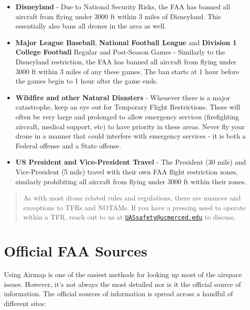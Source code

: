 \documentclass[
]{book}
\providecommand{\tightlist}{%
  \setlength{\itemsep}{0pt}\setlength{\parskip}{0pt}}
\begin{document}
\begin{itemize}
\tightlist
\item
  \textbf{Disneyland} - Due to National Security Risks, the FAA has banned all aircraft from flying under 3000 ft within 3 miles of Disneyland. This essentially also bans all drones in the area as well.\\
\item
  \textbf{Major League Baseball}, \textbf{National Football League} and \textbf{Division 1 College Football} Regular and Post-Season Games - Similarly to the Disneyland restriction, the FAA has banned all aircraft from flying under 3000 ft within 3 miles of any these games. The ban starts at 1 hour before the games begin to 1 hour after the game ends.\\
\item
  \textbf{Wildfire and other Natural Disasters} - Whenever there is a major catastrophe, keep an eye out for Temporary Flight Restrictions. These will often be very large and prolonged to allow emergency services (firefighting aircraft, medical support, etc) to have priority in these areas. Never fly your drone in a manner that could interfere with emergency services - it is both a Federal offense and a State offense.\\
\item
  \textbf{US President and Vice-President Travel} - The President (30 mile) and Vice-President (5 mile) travel with their own FAA flight restriction zones, similarly prohibiting all aircraft from flying under 3000 ft within their zones.
\end{itemize}

\begin{quote}
As with most drone related rules and regulations, there are nuances and exceptions to TFRs and NOTAMs. If you have a pressing need to operate within a TFR, reach out to us at \href{mailto:UASsafety@ucmerced.edu}{\nolinkurl{UASsafety@ucmerced.edu}} to discuss.
\end{quote}

\hypertarget{official-faa-sources}{%
\section{Official FAA Sources}\label{official-faa-sources}}

Using Airmap is one of the easiest methods for looking up most of the airspace issues. However, it's not always the most detailed nor is it the official source of information. The official sources of information is spread across a handful of different sites:
\end{document}
